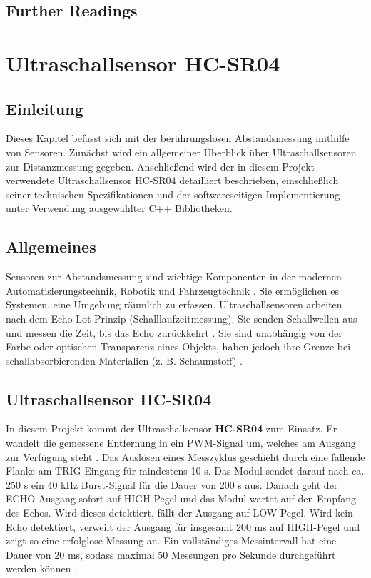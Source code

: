 %
%

\section{Further Readings}

\chapter{Ultraschallsensor HC-SR04}

\section*{Einleitung}
Dieses Kapitel befasst sich mit der berührungslosen Abstandsmessung mithilfe von Sensoren. Zunächst wird ein allgemeiner Überblick über Ultraschallsensoren zur Distanzmessung gegeben. Anschlie\ss end wird der in diesem Projekt verwendete Ultraschallsensor HC-SR04 detailliert beschrieben, einschlie\ss lich seiner technischen Spezifikationen und der softwareseitigen Implementierung unter Verwendung ausgewählter C++ Bibliotheken.

\section{Allgemeines}
Sensoren zur Abstandsmessung sind wichtige  Komponenten in der modernen Automatisierungstechnik, Robotik und Fahrzeugtechnik \cite{Fraden:2016}. Sie ermöglichen es Systemen, eine Umgebung räumlich zu erfassen. 
Ultraschallsensoren  arbeiten nach dem Echo-Lot-Prinzip (Schalllaufzeitmessung). Sie senden Schallwellen aus und messen die Zeit, bis das Echo zurückkehrt \cite{SparkFun:2020}. Sie sind unabhängig von der Farbe oder optischen Transparenz eines Objekts, haben jedoch ihre Grenze bei schallabsorbierenden Materialien (z. B. Schaumstoff) \cite{Fraden:2016}.

\section{Ultraschallsensor HC-SR04}
In diesem Projekt kommt der Ultraschallsensor \textbf{HC-SR04} zum Einsatz. Er wandelt die gemessene Entfernung in ein PWM-Signal um, welches am Ausgang zur Verfügung steht \cite{KT:2012}. Das Auslösen eines Messzyklus geschieht durch eine fallende Flanke am TRIG-Eingang  für mindestens 10 \textmu s. Das Modul sendet darauf nach ca. 250 \textmu s ein 40 kHz Burst-Signal für die Dauer von 200 \textmu s aus. Danach geht der ECHO-Ausgang sofort auf HIGH-Pegel und das Modul wartet auf den Empfang des Echos. Wird dieses detektiert, fällt der Ausgang auf LOW-Pegel. Wird kein Echo detektiert, verweilt der Ausgang für insgesamt 200 ms auf HIGH-Pegel und zeigt so eine erfolglose Messung an. Ein vollständiges Messintervall hat eine Dauer von 20 ms, sodass maximal 50 Messungen pro Sekunde durchgeführt werden können \cite{KT:2012}.

